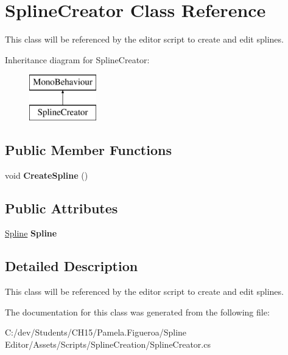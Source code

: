 \hypertarget{class_spline_creator}{}\section{Spline\+Creator Class Reference}
\label{class_spline_creator}


This class will be referenced by the editor script to create and edit splines.  


Inheritance diagram for Spline\+Creator\+:\begin{figure}[H]
\begin{center}
\leavevmode
\includegraphics[height=2.000000cm]{class_spline_creator}
\end{center}
\end{figure}
\subsection*{Public Member Functions}
\begin{DoxyCompactItemize}
\item 
\mbox{\label{class_spline_creator_a173026c4c682141bff5fc5cac4427524}} 
void {\bfseries Create\+Spline} ()
\end{DoxyCompactItemize}
\subsection*{Public Attributes}
\begin{DoxyCompactItemize}
\item 
\mbox{\label{class_spline_creator_ae619cf1a2abcf7d6c2bef10ff8887215}} 
\mbox{\hyperlink{class_spline}{Spline}} {\bfseries Spline}
\end{DoxyCompactItemize}


\subsection{Detailed Description}
This class will be referenced by the editor script to create and edit splines. 



The documentation for this class was generated from the following file\+:\begin{DoxyCompactItemize}
\item 
C\+:/dev/\+Students/\+C\+H15/\+Pamela.\+Figueroa/\+Spline Editor/\+Assets/\+Scripts/\+Spline\+Creation/Spline\+Creator.\+cs\end{DoxyCompactItemize}
